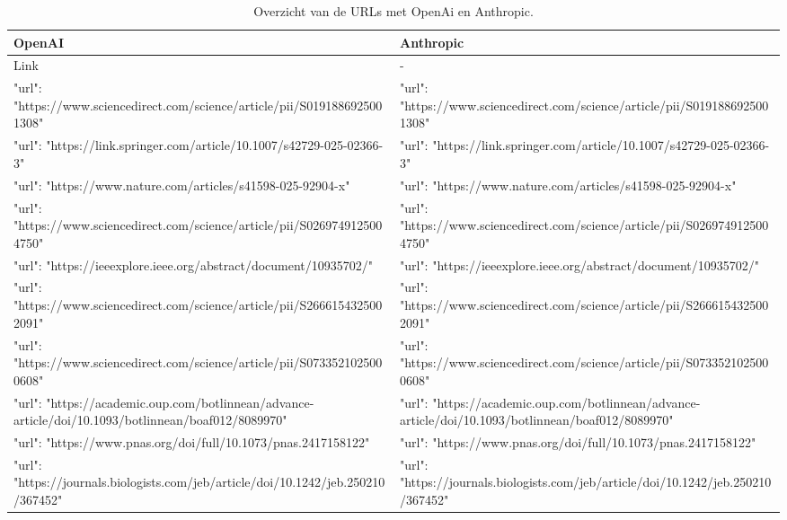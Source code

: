 \begin{table}[h!]
    \caption{Overzicht van de URLs met OpenAi en Anthropic.}
    \centering
    \begin{tabularx}{\textwidth}{|X|X|} 
        \hline
        \rowcolor{lightgray}
        OpenAI & Anthropic \\ 
        \hline
        \rowcolor{lightgray}
        Link & - \\ 
        \hline
        {"url": "https://www.sciencedirect.com/science/article/pii/S0191886925001308"} & {"url": "https://www.sciencedirect.com/science/article/pii/S0191886925001308"} \\ 
        {"url": "https://link.springer.com/article/10.1007/s42729-025-02366-3"} & {"url": "https://link.springer.com/article/10.1007/s42729-025-02366-3"} \\
        {"url": "https://www.nature.com/articles/s41598-025-92904-x"} & {"url": "https://www.nature.com/articles/s41598-025-92904-x"} \\
        {"url": "https://www.sciencedirect.com/science/article/pii/S0269749125004750"} & {"url": "https://www.sciencedirect.com/science/article/pii/S0269749125004750"} \\
        {"url": "https://ieeexplore.ieee.org/abstract/document/10935702/"} & {"url": "https://ieeexplore.ieee.org/abstract/document/10935702/"} \\
        {"url": "https://www.sciencedirect.com/science/article/pii/S2666154325002091"} & {"url": "https://www.sciencedirect.com/science/article/pii/S2666154325002091"} \\
        {"url": "https://www.sciencedirect.com/science/article/pii/S0733521025000608"} & {"url": "https://www.sciencedirect.com/science/article/pii/S0733521025000608"} \\
        {"url": "https://academic.oup.com/botlinnean/advance-article/doi/10.1093/botlinnean/boaf012/8089970"} & {"url": "https://academic.oup.com/botlinnean/advance-article/doi/10.1093/botlinnean/boaf012/8089970"} \\
        {"url": "https://www.pnas.org/doi/full/10.1073/pnas.2417158122"} & {"url": "https://www.pnas.org/doi/full/10.1073/pnas.2417158122"} \\
        {"url": "https://journals.biologists.com/jeb/article/doi/10.1242/jeb.250210/367452"} & {"url": "https://journals.biologists.com/jeb/article/doi/10.1242/jeb.250210/367452"} \\
        \hline
    \end{tabularx}
    \label{table:llmUrl}
\end{table}
